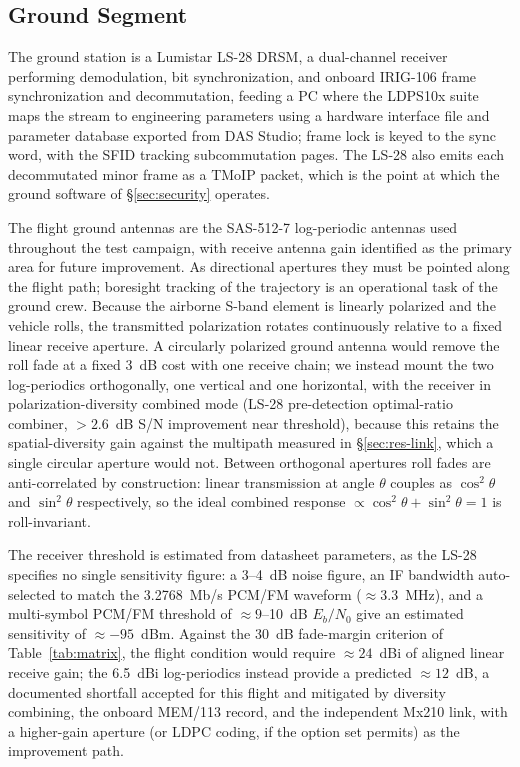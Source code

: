 \documentclass[12pt,letterpaper]{article}
\begin{document}
\subsection{Ground Segment}\label{sec:ground}

The ground station is a Lumistar LS-28 DRSM, a dual-channel receiver performing
demodulation, bit synchronization, and onboard IRIG-106 frame synchronization and
decommutation, feeding a PC where the LDPS10x suite maps the stream to engineering
parameters using a hardware interface file and parameter database exported from DAS
Studio; frame lock is keyed to the sync word, with the SFID tracking subcommutation pages.
The LS-28 also emits each decommutated minor frame as a TMoIP packet, which is the point at
which the ground software of \S\ref{sec:security} operates.

The flight ground antennas are the SAS-512-7 log-periodic antennas used throughout the test
campaign, with receive antenna gain identified as the primary area for future improvement.
As directional apertures they must be pointed along the flight path; boresight tracking of
the trajectory is an operational task of the ground crew. Because the airborne S-band
element is linearly polarized and the vehicle rolls, the transmitted polarization rotates
continuously relative to a fixed linear receive aperture. A circularly polarized ground
antenna would remove the roll fade at a fixed 3~dB cost with one receive chain; we instead
mount the two log-periodics orthogonally, one vertical and one horizontal, with the
receiver in polarization-diversity combined mode (LS-28 pre-detection optimal-ratio
combiner, ${>}2.6$~dB S/N improvement near threshold), because this retains the
spatial-diversity gain against the multipath measured in \S\ref{sec:res-link}, which a
single circular aperture would not. Between orthogonal apertures roll fades are
anti-correlated by construction: linear transmission at angle $\theta$ couples as
$\cos^2\theta$ and $\sin^2\theta$ respectively, so the ideal combined response
$\propto \cos^2\theta + \sin^2\theta = 1$ is roll-invariant.

The receiver threshold is estimated from datasheet parameters, as the LS-28 specifies no
single sensitivity figure: a 3--4~dB noise figure, an IF bandwidth auto-selected to match
the 3.2768~Mb/s PCM/FM waveform (${\approx}3.3$~MHz), and a multi-symbol PCM/FM threshold
of ${\approx}9$--10~dB $E_b/N_0$ give an estimated sensitivity of ${\approx}{-95}$~dBm.
Against the 30~dB fade-margin criterion of Table~\ref{tab:matrix}, the flight condition
would require ${\approx}24$~dBi of aligned linear receive gain; the 6.5~dBi log-periodics
instead provide a predicted ${\approx}12$~dB, a documented shortfall accepted for this
flight and mitigated by diversity combining, the onboard MEM/113 record, and the independent
Mx210 link, with a higher-gain aperture (or LDPC coding, if the option set permits) as the
improvement path.
\end{document}
